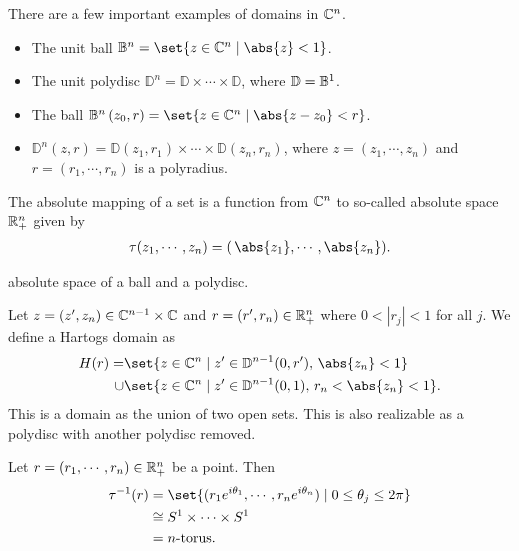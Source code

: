 \begin{definition}
    There are a few important examples of domains in $\mathbb{C}^n$.
    \begin{itemize}
        \item The unit ball $\ball{n} = \set{z \in \C^n \mid \abs{z} < 1}$.
        \item The unit polydisc $\mathbb{D}^n = \mathbb{D} \times \cdots \times \mathbb{D}$, where $\mathbb{D} = \ball{1}$.
        \item The ball $\ball{z_0}{r}{n} = \set{z \in \C^n \mid \abs{z-z_0} < r}$.
        \item $\mathbb{D}^n(z,r) = \mathbb{D}(z_1,r_1) \times \cdots \times \mathbb{D}(z_n,r_n)$, where $z = (z_1 , \cdots, z_n)$ and $r = (r_1, \cdots, r_n)$ is a polyradius.
    \end{itemize}
\end{definition}

\begin{definition}
    The absolute mapping of a set is a function from $\mathbb{C}^n$ to so-called absolute space $\mathbb{R}^n_+$ given by
    \begin{align*}
        \tau (z_1 , \cdots , z_n) = (\, \abs{z_1} , \cdots, \abs{z_n}).
    \end{align*}
\end{definition}

\begin{example}
    absolute space of a ball and a polydisc.
\end{example}

\begin{definition}
    Let $z = (z' , z_n) \in \mathbb{C}^{n-1} \times \mathbb{C}$ and $r = (r',r_n) \in \mathbb{R}^n_+$ where $ 0 < |r_j| < 1$ for all $j$. We define a Hartogs domain as
    \begin{align*}
        H(r)  = &\set{z \in \C^n \mid z' \in \mathbb{D}^{n-1} (0,r') , \, \abs{z_n} < 1}\\
        \cup &\set{z \in \C^n \mid z' \in \mathbb{D}^{n-1} (0,1) , \, r_n < \abs{z_n} < 1}.
    \end{align*}
    This is a domain as the union of two open sets. This is also realizable as a polydisc with another polydisc removed.
\end{definition}

\begin{remark}
    Let $ r = (r_1 , \cdots, r_n) \in \mathbb{R}^n_+$ be a point. Then
    \begin{align*}
        \tau^{-1}(r ) &= \set{ (r_1 e^{i \theta_1} , \cdots , r_n e^{i \theta_n}  ) \mid 0 \leq \theta_j \leq 2 \pi}\\
        &\cong S^1 \times \cdots \times S^1\\
        &= \text{$n$-torus}.
    \end{align*}
\end{remark}

